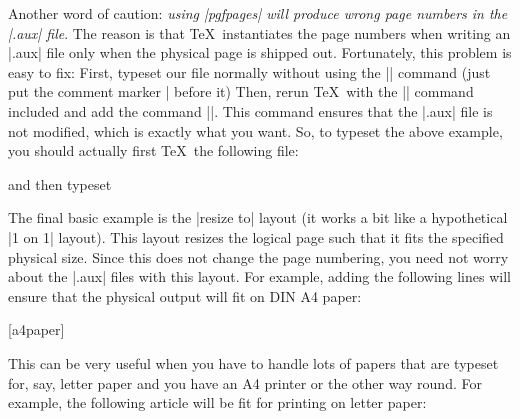 Another word of caution: \emph{using |pgfpages| will produce wrong page numbers
in the |.aux| file}. The reason is that \TeX\ instantiates the page numbers
when writing an |.aux| file only when the physical page is shipped out.
Fortunately, this problem is easy to fix: First, typeset our file normally
without using the |\pgfpagesuselayout| command (just put the comment marker |%
before it) Then, rerun \TeX\ with the |\pgfpagesuselayout| command included and
add the command |\nofiles|. This command ensures that the |.aux| file is not
modified, which is exactly what you want. So, to typeset the above example, you
should actually first \TeX\ the following file:
%
%
and then typeset
%

The final basic example is the |resize to| layout (it works a bit like a
hypothetical |1 on 1| layout). This layout resizes the logical page such that
it fits the specified physical size. Since this does not change the page
numbering, you need not worry about the |.aux| files with this layout. For
example, adding the following lines will ensure that the physical output will
fit on DIN A4 paper:
%
\begin{codeexample}
\usepackage{pgfpages}
[a4paper]
\end{codeexample}

This can be very useful when you have to handle lots of papers that are typeset
for, say, letter paper and you have an A4 printer or the other way round. For
example, the following article will be fit for printing on letter paper:
%


